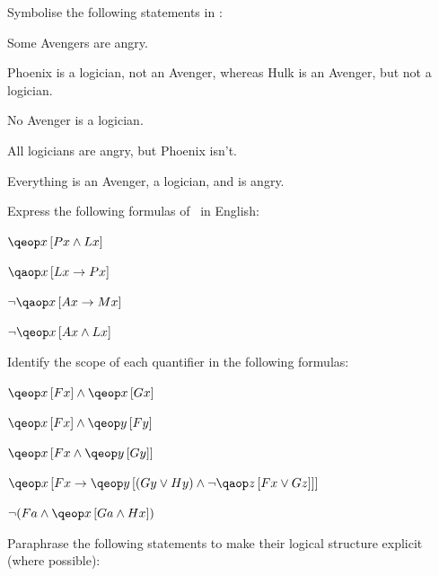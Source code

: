 \documentclass[PHIL101-Textbook.tex]{subfiles}
\begin{document}
\noindent\problempart
\label{pr.pl.symbol3}
Symbolise the following statements in \pl:
\begin{earg}
\item Some Avengers are angry.
\item Phoenix is a logician, not an Avenger, whereas Hulk is an Avenger, but not a logician. 
\item No Avenger is a logician.
\item All logicians are angry, but Phoenix isn't. 
\item Everything is an Avenger, a logician, and is angry. 
\end{earg}

\noindent\problempart

Express the following formulas of \pl\ in English: 
\begin{earg}
\item $\qeb{x}{\atom P x \eand \atom L x}$
\item $\qab{x}{\atom L x \eif \atom P x}$
\item $\enot \qab{x}{\atom A x \eif \atom M x}$
\item $\enot \qeb{x}{\atom A x \eand \atom L x}$
\end{earg}

\noindent\solutions\problempart\label{pr.scope}

Identify the scope of each quantifier in the following formulas: 
\begin{earg}
\item $\qeb{x}{ \atom F x} \land \qeb{x}{ \atom G x}$
\item $\qeb{x}{ \atom F x} \land \qeb{y}{ \atom F y}$
\item $\qeb{x}{ \atom F x \land \qeb{y}{ \atom Gy}}$
\item $\qeb{x}{ \atom F x \eif  \qeb{y}{(\atom G y \lor \atom H y)\land \enot \qab{z}{\atom F x \lor \atom Gz}}}$
  \item $\enot(\atom F a \land \qeb{x}{ \atom G a \land \atom Hx})$
\end{earg}


\pagebreak
\noindent\problempart

Paraphrase the following statements to make their logical structure explicit (where possible): 
\end{document}
